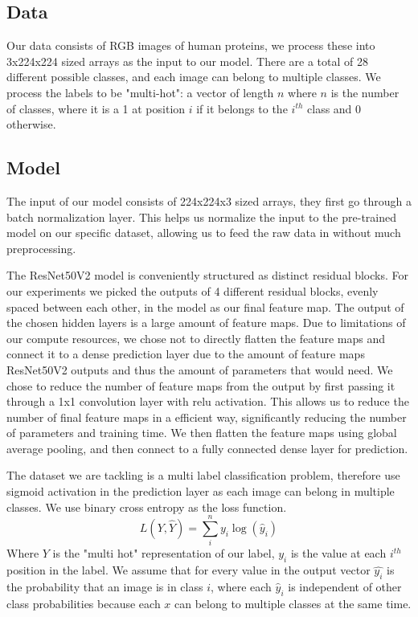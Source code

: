\documentclass{article}
\begin{document}
\subsection{Data}
Our data consists of RGB images of human proteins, we process these into 3x224x224 sized
arrays as the input to our model. There are a total of 28 different possible classes,
and each image can belong to multiple classes. We process the labels to be "multi-hot":
a vector of length $n$ where $n$ is the number of classes, where it is a 1 at position $i$ if 
it belongs to the $i^{th}$ class and 0 otherwise.
\subsection{Model}

The input of our model consists of 224x224x3 sized arrays, they first go through a batch normalization layer\cite{ioffe2015batch}. This helps
us normalize the input to the pre-trained model on our specific dataset, allowing us 
to feed the raw data in without much preprocessing.

The ResNet50V2 model is conveniently structured as distinct residual blocks.
For our experiments we picked the outputs of 4 different residual blocks, evenly spaced between each other, in the model
as our final feature map. The output of the chosen hidden layers is a large amount of 
feature maps. Due to limitations of our compute resources, we chose not to directly flatten the feature maps and connect it to a dense prediction
layer due to the amount of feature maps ResNet50V2 outputs and thus the amount of parameters that would need. We chose to reduce the number of 
feature maps from the output by first passing it through a 1x1 convolution layer\cite{szegedy2014going} with 
relu activation. This allows us to reduce the number of final feature maps in a efficient way, significantly reducing the number of parameters and training time. 
We then flatten the feature maps using global average pooling\cite{Lin2013NetworkIN}, and then connect to a 
fully connected dense layer for prediction. 

The dataset we are tackling is a multi label classification problem, therefore use sigmoid activation
in the prediction layer as each image can belong in multiple classes. We  use binary cross entropy as the loss function. 
\begin{equation}
    L(Y, \hat{Y}) = \sum_i^n y_i\log{(\hat{y}_i)}
\end{equation}
Where $Y$ is the "multi hot" representation of our label, $y_i$
is the value at each $i^{th}$ position in the label.  We assume that for every value in the output vector $\hat{y_i}$ is the probability
that an image is in class $i$, where each $\hat{y}_i$ is independent of other class probabilities because 
each $x$ can belong to multiple classes at the same time. 
\end{document}

